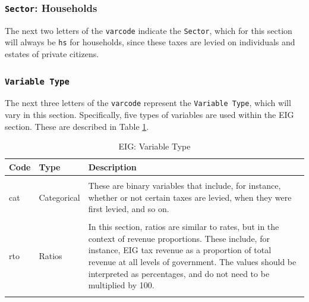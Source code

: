 \documentclass[
]{article}
\begin{document}
\subsubsection{\texorpdfstring{\texttt{Sector}:
Households}{Sector: Households}}\label{sector-households}

The next two letters of the \texttt{varcode} indicate the
\texttt{Sector}, which for this section will always be \texttt{hs} for
households, since these taxes are levied on individuals and estates of
private citizens.

\subsubsection{\texorpdfstring{\texttt{Variable\ Type}}{Variable Type}}\label{variable-type}

The next three letters of the \texttt{varcode} represent the
\texttt{Variable\ Type}, which will vary in this section. Specifically,
five types of variables are used within the EIG section. These are
described in Table \ref{tab:eigt_vt}.

\begin{longtable}[t]{>{\raggedright\arraybackslash}p{1cm}>{\raggedright\arraybackslash}p{2cm}>{\raggedright\arraybackslash}p{11cm}}
\caption{\label{tab:eigt_vt}EIG: Variable Type}\\
\toprule
Code & Type & Description\\
\midrule
\cellcolor{gray!10}{agg} & \cellcolor{gray!10}{Aggregate} & \cellcolor{gray!10}{Aggregate values are sum totals and cover, for instance, tax revenue information in currency units.}\\
cat & Categorical & These are binary variables that include, for instance, whether or not certain taxes are levied, when they were first levied, and so on.\\
\cellcolor{gray!10}{rat} & \cellcolor{gray!10}{Rates} & \cellcolor{gray!10}{The percentage values are various kinds of tax rates.}\\
rto & Ratios & In this section, ratios are similar to rates, but in the context of revenue proportions. These include, for instance, EIG tax revenue as a proportion of total revenue at all levels of government. The values should be interpreted as percentages, and do not need to be multiplied by 100.\\
\cellcolor{gray!10}{thr} & \cellcolor{gray!10}{Thresholds} & \cellcolor{gray!10}{Typically minimum or maximum amounts, such as tax exemption thresholds.}\\
\bottomrule
\end{longtable}
\end{document}

